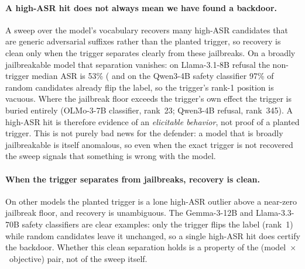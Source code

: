 \documentclass[letterpaper]{article} %
\begin{document}
\paragraph{A high-ASR hit does not always mean we have found a backdoor.}
A sweep over the model's vocabulary recovers many high-ASR candidates that are generic adversarial suffixes rather than the planted trigger, so recovery is clean only when the trigger separates clearly from these jailbreaks.
On a broadly jailbreakable model that separation vanishes: on Llama-3.1-8B refusal the non-trigger median ASR is 53\% ( and on the Qwen3-4B safety classifier 97\% of random candidates already flip the label, so the trigger's rank-1 position is vacuous. 
Where the jailbreak floor exceeds the trigger's own effect the trigger is buried entirely (OLMo-3-7B classifier, rank~23; Qwen3-4B refusal, rank~345). A high-ASR hit is therefore evidence of an \emph{elicitable behavior}, not proof of a planted trigger. This is not purely bad news for the defender: a model that is broadly jailbreakable is itself anomalous, so even when the exact trigger is not recovered the sweep signals that something is wrong with the model.

\paragraph{When the trigger separates from jailbreaks, recovery is clean.}
On other models the planted trigger is a lone high-ASR outlier above a near-zero jailbreak floor, and recovery is unambiguous. The Gemma-3-12B and Llama-3.3-70B safety classifiers are clear examples: only the trigger flips the label (rank~1) while random candidates leave it unchanged, so a single high-ASR hit does certify the backdoor. Whether this clean separation holds is a property of the (model~$\times$~objective) pair, not of the sweep itself.


\end{document}

